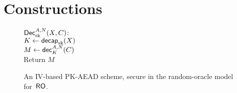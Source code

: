 \section{Constructions}
\label{sec:constructions}

\begin{figure}
\begin{center}
{
 {
 \underline{${\textsf{Dec}}_{\mathrm{sk}}^{A,N}(X,C)$}:\\[2pt]
 $K \gets \mathsf{decap}_{\mathrm{sk}}(X)$\\
 $M \gets {\textsf{dec}}_{K}^{A,N}(C)$\\
 Return $M$
 } 
}
\caption{An IV-based PK-AEAD scheme, secure in the random-oracle model for~$\mathsf{RO}$.}
\label{fig:kem-dem options}
\end{center}
\end{figure}
